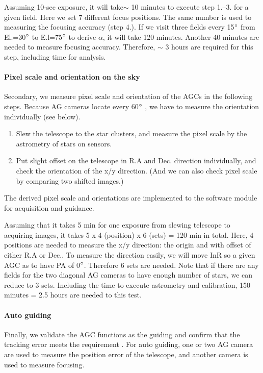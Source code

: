 Assuming 10-sec exposure, it will take$\sim$ 10 minutes to execute step 1.--3. for a given field.
Here we set 7 different focus positions.
The same number is used to measuring the focusing accuracy (step 4.).
If we visit three fields every 15$^\circ$ from El.=30$^\circ$ to E.l=75$^\circ$ to derive $\alpha$, it will take 120 minutes.
Another 40 minutes are needed to measure focusing accuracy.
Therefore, $\sim$ 3 hours are required for this step, including time for analysis.

\paragraph{Pixel scale and orientation on the sky}
Secondary, we measure pixel scale and orientation of the AGCs in the following steps.
Because AG cameras locate every 60$^\circ$ , we have to measure the orientation individually (see below).

\begin{enumerate}
\item Slew the telescope to the star clusters, and measure the pixel scale by the astrometry of stars on sensors.
\item Put slight offset on the telescope in R.A and Dec. direction individually, and check the orientation of the x/y direction.
(And we can also check pixel scale by comparing two shifted images.)
\end{enumerate}
The derived pixel scale and orientations are implemented to the software module for acquisition and guidance.

Assuming that it takes 5 min for one exposure from slewing telescope to acquiring images, 
it takes 5 x 4 (position) x 6 (sets) = 120 min in total.
Here, 4 positions are needed  to measure the x/y  direction: the origin and with offset of either R.A or Dec..
To measure the direction easily, we will move InR so a given AGC as to have PA of 0$^\circ$.
Therefore 6 sets are needed.
Note that if there are any fields for the two diagonal AG cameras to have enough number of stars, we can reduce to 3 sets.
Including the time to execute astrometry and calibration, 150 minutes = 2.5 hours are needed to this test.


\paragraph{Auto guiding}
Finally, we validate the AGC functions as the guiding and confirm that the tracking error meets the requirement .
For auto guiding, one or two AG camera are used to measure the position error of the telescope, and another camera is used to measure focusing.

